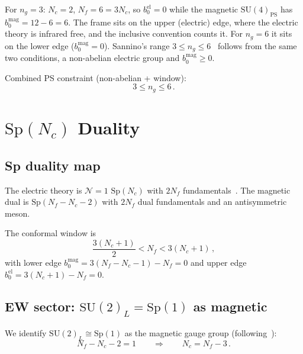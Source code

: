 \documentclass[11pt,a4paper]{article}
\theoremstyle{plain}
\theoremstyle{definition}
\theoremstyle{remark}
\newcommand{\Nc}{N_{\!c}}
\newcommand{\Nf}{N_{\!f}}
\newcommand{\ngen}{n_g}
\newcommand{\SU}[1]{\mathrm{SU}(#1)}
\newcommand{\Sp}[1]{\mathrm{Sp}(#1)}
\begin{document}
For $\ngen = 3$: $\Nc = 2$, $\Nf = 6 = 3\Nc$, so
$b_0^{\mathrm{el}} = 0$ while the magnetic $\SU{4}_{\mathrm{PS}}$ has
$b_0^{\mathrm{mag}} = 12 - 6 = 6$.  The frame sits on the upper
(electric) edge, where the electric theory is infrared free, and the
inclusive convention counts it.  For $\ngen = 6$ it sits on the lower
edge ($b_0^{\mathrm{mag}} = 0$).  Sannino's range
$3 \leq \ngen \leq 6$~\cite{Sannino2011} follows from the same two
conditions, a non-abelian electric group and $b_0^{\mathrm{mag}} \geq 0$.

Combined PS constraint (non-abelian + window):
\begin{equation}\label{eq:PS-combined}
  3 \leq \ngen \leq 6\,.
\end{equation}


\section{$\Sp{\Nc}$ Duality}
\label{sec:Sp-duality}

\subsection{Sp duality map}

The electric theory is $\mathcal{N}=1$ $\Sp{\Nc}$ with $2\Nf$
fundamentals~\cite{IP9505006,IS1995}.  The magnetic dual is
$\Sp{\Nf - \Nc - 2}$ with $2\Nf$ dual fundamentals and an antisymmetric
meson.

The conformal window is
\begin{equation}\label{eq:Sp-CW}
  \frac{3(\Nc + 1)}{2} < \Nf < 3(\Nc + 1)\,,
\end{equation}
with lower edge $b_0^{\mathrm{mag}} = 3(\Nf - \Nc - 1) - \Nf = 0$ and
upper edge $b_0^{\mathrm{el}} = 3(\Nc + 1) - \Nf = 0$.

\subsection{EW sector: $\SU{2}_L = \Sp{1}$ as magnetic}

We identify $\SU{2}_L \cong \Sp{1}$ as the magnetic gauge group
(following~\cite{Paper1}):
\begin{equation}\label{eq:Sp-constraint}
  \Nf - \Nc - 2 = 1
  \qquad\Longrightarrow\qquad
  \Nc = \Nf - 3\,.
\end{equation}
\end{document}

